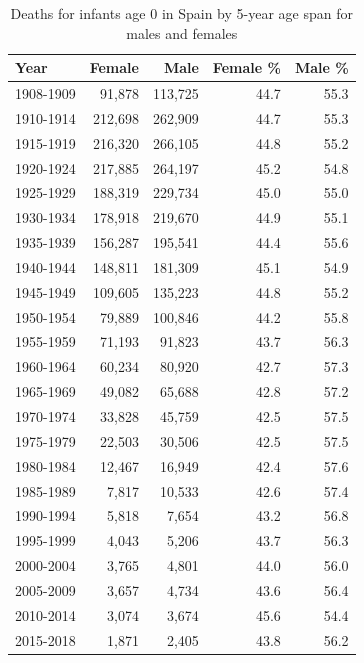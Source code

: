 \documentclass[]{article}
\begin{document}
\begin{table}

\caption{\label{tab:deathtable}Deaths for infants age 0 in Spain by 5-year age span for males and females}
\begin{tabular}[t]{l|r|r|r|r}
\hline
Year & Female & Male & Female \% & Male \%\\
\hline
1908-1909 & 91,878 & 113,725 & 44.7 & 55.3\\
\hline
1910-1914 & 212,698 & 262,909 & 44.7 & 55.3\\
\hline
1915-1919 & 216,320 & 266,105 & 44.8 & 55.2\\
\hline
1920-1924 & 217,885 & 264,197 & 45.2 & 54.8\\
\hline
1925-1929 & 188,319 & 229,734 & 45.0 & 55.0\\
\hline
1930-1934 & 178,918 & 219,670 & 44.9 & 55.1\\
\hline
1935-1939 & 156,287 & 195,541 & 44.4 & 55.6\\
\hline
1940-1944 & 148,811 & 181,309 & 45.1 & 54.9\\
\hline
1945-1949 & 109,605 & 135,223 & 44.8 & 55.2\\
\hline
1950-1954 & 79,889 & 100,846 & 44.2 & 55.8\\
\hline
1955-1959 & 71,193 & 91,823 & 43.7 & 56.3\\
\hline
1960-1964 & 60,234 & 80,920 & 42.7 & 57.3\\
\hline
1965-1969 & 49,082 & 65,688 & 42.8 & 57.2\\
\hline
1970-1974 & 33,828 & 45,759 & 42.5 & 57.5\\
\hline
1975-1979 & 22,503 & 30,506 & 42.5 & 57.5\\
\hline
1980-1984 & 12,467 & 16,949 & 42.4 & 57.6\\
\hline
1985-1989 & 7,817 & 10,533 & 42.6 & 57.4\\
\hline
1990-1994 & 5,818 & 7,654 & 43.2 & 56.8\\
\hline
1995-1999 & 4,043 & 5,206 & 43.7 & 56.3\\
\hline
2000-2004 & 3,765 & 4,801 & 44.0 & 56.0\\
\hline
2005-2009 & 3,657 & 4,734 & 43.6 & 56.4\\
\hline
2010-2014 & 3,074 & 3,674 & 45.6 & 54.4\\
\hline
2015-2018 & 1,871 & 2,405 & 43.8 & 56.2\\
\hline
\end{tabular}
\end{table}
\end{document}
